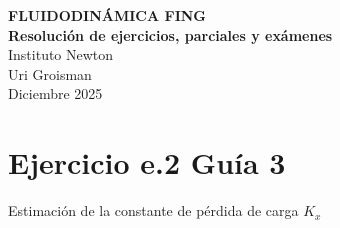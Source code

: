 \documentclass[12pt, a4paper]{article}
\newcommand{\TituloEjercicio}{
    \begin{center}
        {\Large \textbf{FLUIDODINÁMICA FING}}\\[0.3em]
        {\large \textbf{Resolución de ejercicios, parciales y exámenes}}\\[0.8em]
        {\large Instituto Newton}\\[0.8em]
        {\normalsize Uri Groisman}\\
        {\normalsize Diciembre 2025} %
    \end{center}

    \vspace{2em}
}
\begin{document}
\TituloEjercicio


\section*{Ejercicio e.2  Guía 3}

{\large Estimación de la constante de pérdida de carga $K_x$ }

\vspace{1.5em}

\end{document}
